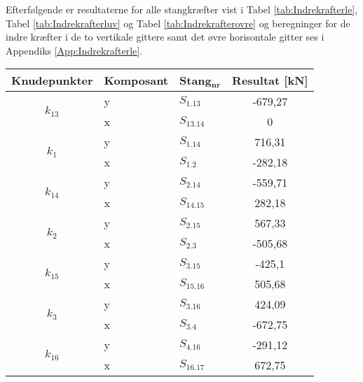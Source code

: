 Efterfølgende er resultaterne for alle stangkræfter vist i Tabel \ref{tab:Indrekrafterle}, Tabel \ref{tab:Indrekrafterluv} og Tabel \ref{tab:Indrekrafterovre} og beregninger for de indre kræfter i de to vertikale gittere samt det øvre horisontale gitter ses i Appendiks \ref{App:Indrekrafterle}.

\begin{table}[htbp]
\centering
\begin{tabular}{|c|l|l|c|}
\hline
\textbf{Knudepunkter}     & \textbf{Komposant} & \textbf{Stang$_{\textbf{nr}}$} & \textbf{Resultat [kN]} \\ \hline
\multirow{2}{*}{$k_{13}$} & y                  & $S_{1.13}$            & -679,27           \\ \cline{2-4} 
                          & x                  & $S_{13.14}$           & 0                 \\ \hline
\multirow{2}{*}{$k_1$}    & y                  & $S_{1.14}$            & 716,31          \\ \cline{2-4} 
                          & x                  & $S_{1.2}$             & -282,18           \\ \hline
\multirow{2}{*}{$k_{14}$} & y                  & $S_{2.14}$            & -559,71           \\ \cline{2-4} 
                          & x                  & $S_{14.15}$           & 282,18           \\ \hline
\multirow{2}{*}{$k_{2}$}  & y                  & $S_{2.15}$            & 567,33            \\ \cline{2-4} 
                          & x                  & $S_{2.3}$             & -505,68           \\ \hline
\multirow{2}{*}{$k_{15}$} & y                  & $S_{3.15}$            & -425,1           \\ \cline{2-4} 
                          & x                  & $S_{15.16}$           & 505,68            \\ \hline
\multirow{2}{*}{$k_{3}$}  & y                  & $S_{3.16}$            & 424,09               \\ \cline{2-4} 
                          & x                  & $S_{3.4}$             & -672,75          \\ \hline
\multirow{2}{*}{$k_{16}$} & y                  & $S_{4.16}$            & -291,12           \\ \cline{2-4} 
                          & x                  & $S_{16.17}$           & 672,75          \\ \hline

\end{tabular}
\end{table}
